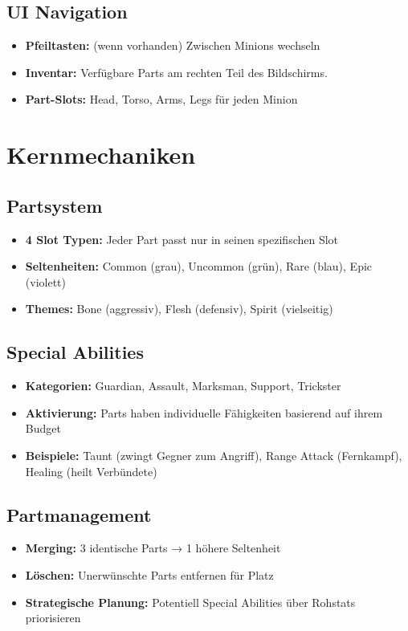 \subsection{UI Navigation}
\begin{itemize}
    \item \textbf{Pfeiltasten:} (wenn vorhanden) Zwischen Minions wechseln
    \item \textbf{Inventar:} Verfügbare Parts am rechten Teil des Bildschirms.
    \item \textbf{Part-Slots:} Head, Torso, Arms, Legs für jeden Minion
\end{itemize}

\section{Kernmechaniken}

\subsection{Partsystem}
\begin{itemize}
    \item \textbf{4 Slot Typen:} Jeder Part passt nur in seinen spezifischen Slot
    \item \textbf{Seltenheiten:} Common (grau), Uncommon (grün), Rare (blau), Epic (violett)
    \item \textbf{Themes:} Bone (aggressiv), Flesh (defensiv), Spirit (vielseitig)
\end{itemize}

\subsection{Special Abilities}
\begin{itemize}
    \item \textbf{Kategorien:} Guardian, Assault, Marksman, Support, Trickster
    \item \textbf{Aktivierung:} Parts haben individuelle Fähigkeiten basierend auf ihrem Budget
    \item \textbf{Beispiele:} Taunt (zwingt Gegner zum Angriff), Range Attack (Fernkampf), Healing (heilt Verbündete)
\end{itemize}

\subsection{Partmanagement}
\begin{itemize}
    \item \textbf{Merging:} 3 identische Parts → 1 höhere Seltenheit
    \item \textbf{Löschen:} Unerwünschte Parts entfernen für Platz
    \item \textbf{Strategische Planung:} Potentiell Special Abilities über Rohstats priorisieren
\end{itemize}

